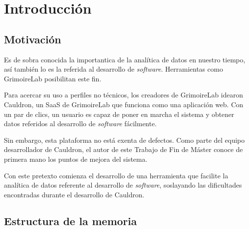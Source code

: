 
\chapter{Introducción} %

\label{Chapter1} %


\newcommand{\keyword}[1]{\textbf{#1}}
\newcommand{\tabhead}[1]{\textbf{#1}}
\newcommand{\code}[1]{\texttt{#1}}
\newcommand{\file}[1]{\texttt{\bfseries#1}}
\newcommand{\option}[1]{\texttt{\itshape#1}}


\section{Motivación}

Es de sobra conocida la importantica de la analítica de datos en nuestro tiempo, así también lo es la referida al desarrollo de \emph{software}. Herramientas como GrimoireLab posibilitan este fin.

Para acercar su uso a perfiles no técnicos, los creadores de GrimoireLab idearon Cauldron, un SaaS de GrimoireLab que funciona como una aplicación web. Con un par de clics, un usuario es capaz de poner en marcha el sistema y obtener datos referidos al desarrollo de \emph{software} fácilmente.

Sin embargo, esta plataforma no está exenta de defectos. Como parte del equipo desarrollador de Cauldron, el autor de este Trabajo de Fin de Máster conoce de primera mano los puntos de mejora del sistema.

Con este pretexto comienza el desarrollo de una herramienta que facilite la analítica de datos referente al desarrollo de \emph{software}, soslayando las dificultades encontradas durante el desarrollo de Cauldron.


\section{Estructura de la memoria}

